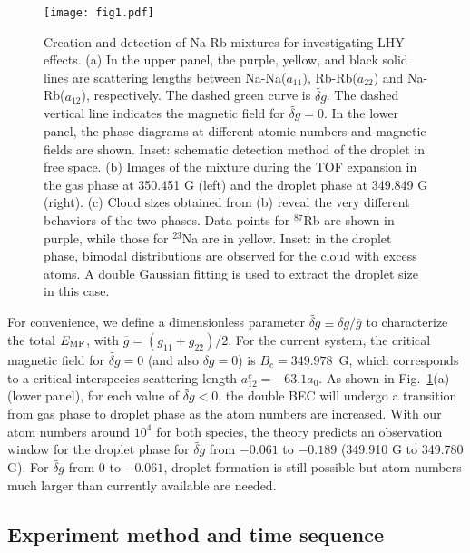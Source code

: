 \begin{figure}[hbt]
\begin{center}
\texttt{[image: fig1.pdf]}
\end{center}
\caption[Creation and detection of Na-Rb mixtures for investigating LHY effects]{Creation and detection of Na-Rb mixtures for investigating LHY effects. (a) In the upper panel, the purple, yellow, and black solid lines are scattering lengths between Na-Na($a_{11}$), Rb-Rb($a_{22}$) and Na-Rb($a_{12}$), respectively. The dashed green curve is $\widetilde{\delta g}$. The dashed vertical line indicates the magnetic field for $\widetilde{\delta g} = 0$. In the lower panel, the phase diagrams at different atomic numbers and magnetic fields are shown. Inset: schematic detection method of the droplet in free space. (b) Images of the mixture during the TOF expansion in the gas phase at 350.451 G (left) and the droplet phase at 349.849 G (right). (c) Cloud sizes obtained from (b) reveal the very different behaviors of the two phases. Data points for $^{87}$Rb are shown in purple, while those for $^{23}$Na are in yellow. Inset: in the droplet phase, 
bimodal distributions are observed for the cloud with excess atoms. A double Gaussian fitting is used to extract the droplet size in this case.
}
\label{fig1}
\end{figure}

For convenience, we define a dimensionless parameter $\widetilde{\delta g} \equiv \delta g/\overline{g}$ to characterize the total $E_{\rm MF}$, with $\overline{g} = (g_{11}+g_{22})/2$. For the current system, the critical magnetic field for $\widetilde{\delta g} = 0$ (and also $\delta g= 0$) is $B_c = 349.978$~G, which corresponds to a critical interspecies scattering length $a^c_{12} = -63.1 a_0$. As shown in Fig.~\ref{fig1}(a) (lower panel), for each value of $\widetilde{\delta g} < 0$, the double BEC will undergo a transition from gas phase to droplet phase as the atom numbers are increased. With our atom numbers around $10^4$ for both species, the theory predicts an observation window for the droplet phase for $\widetilde{\delta g}$ from $-0.061$ to $-0.189$ (349.910 G to 349.780 G). For $\widetilde{\delta g}$ from 0 to $-0.061$, droplet formation is still possible but atom numbers much larger than currently available are needed.

\subsection{Experiment method and time sequence}

